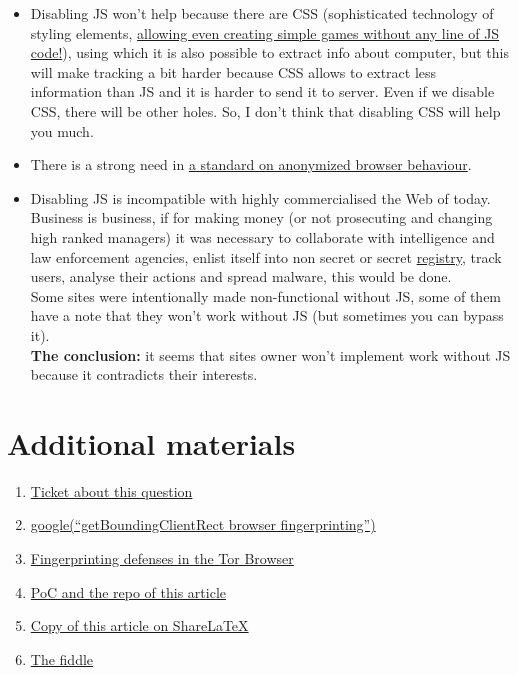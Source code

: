 \documentclass[letterpaper,14pt]{article}
\begin{document}
\begin{itemize}
\item
  Disabling JS won't help because there are CSS (sophisticated technology of styling elements, \href{https://github.com/i0z/nojsgame}{allowing even creating simple games without any line of JS code!}), using which it is also possible to extract info about computer, but this will make tracking a bit harder because CSS allows to extract less information than JS and it is harder to send it to server. Even if we disable CSS, there will be other holes. So, I don't think that disabling CSS will help you much.
\item
  There is a strong need in \href{https://trac.torproject.org/projects/tor/ticket/14310}{a standard on anonymized browser behaviour}.
\item
  Disabling JS is incompatible with highly commercialised the Web of today.\\
  Business is business, if for making money (or not prosecuting and changing high ranked managers) it was necessary to collaborate with intelligence and law enforcement agencies, enlist itself into non secret or secret \href{http://97-fz.rkn.gov.ru/}{registry}, track users, analyse their actions and spread malware, this would be done.\\
  Some sites were intentionally made non-functional without JS, some of them have a note that they won't work without JS (but sometimes you can bypass it).\\
  \textbf{The conclusion:} it seems that sites owner won't implement work without JS because it contradicts their interests.
\end{itemize}

\section{Additional materials}\label{additional-materials}

\begin{enumerate}
\itemsep1pt\parskip0pt
\item
  \href{https://trac.torproject.org/projects/tor/ticket/13400}{Ticket about this question}
\item
  \href{https://www.google.com/search?num=100\&newwindow=1\&q=getBoundingClientRect+browser+fingerprinting}{google(``getBoundingClientRect browser fingerprinting'')}
\item
  \href{https://www.torproject.org/projects/torbrowser/design/\#fingerprinting-defenses}{Fingerprinting defenses in the Tor Browser}
\item
  \href{https://github.com/KOLANICH/Article-2015-Dull-captaincy-or-the-way-Tor-Project-fights-browser-fingerprinting}{PoC and the repo of this article}
\item
  \href{https://www.sharelatex.com/github/repos/KOLANICH/Article-2015-Dull-captaincy-or-the-way-Tor-Project-fights-browser-fingerprinting}{Copy of this article on Share\LaTeX}
\item
  \href{http://jsfiddle.net/fyw4qmdg/5/}{The fiddle}
\end{enumerate}
\end{document}
